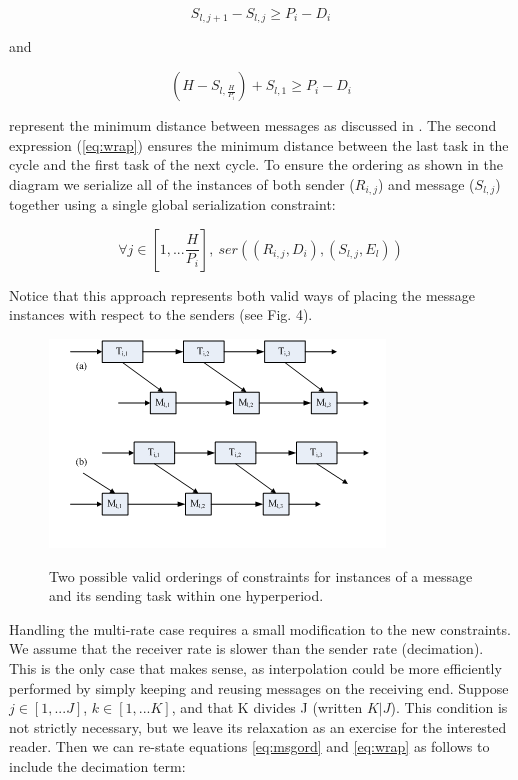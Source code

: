 \begin{equation}
\label{eq:msgord}
S_{l,j + 1}  - S_{l,j}  \geqslant P_i  - D_i 
\end{equation}

and

\begin{equation}
\label{eq:wrap}
(H - S_{l,\frac{H}
{{P_i }}} ) + S_{l,1}  \geqslant P_i  - D_i 
\end{equation}

represent the minimum distance between messages as discussed in \cite{sched:constr}.  The second expression (\ref{eq:wrap}) ensures the minimum distance between the last task in the cycle and the first task of the next cycle.
	To ensure the ordering as shown in the diagram we serialize all of the instances of both sender ($R_{i,j}$) and message ($S_{l,j}$) together using a single global serialization constraint:

\begin{equation}
\forall j \in [1,...\frac{H}{{P_i }}],\ ser((R_{i,j} ,D_i ),(S_{l,j} ,E_l ))
\end{equation}

Notice that this approach represents both valid ways of placing the message instances with respect to the senders (see Fig. 4).

\begin{figure}
		\includegraphics[scale=.6]{figures/possibilities.png}
		\centering
	  \label{fig:possibilities}
		\caption{Two possible valid orderings of constraints for instances of a message and its sending task within one hyperperiod.}
\end{figure}

Handling the multi-rate case requires a small modification to the new constraints.  We assume that the receiver rate is slower than the sender rate (decimation). This is the only case that makes sense, as interpolation could be more efficiently performed by simply keeping and reusing messages on the receiving end.  Suppose $j \in [1,...J]$, $k \in [1,...K]$, and that K divides J (written $K|J$).  This condition is not strictly necessary, but we leave its relaxation as an exercise for the interested reader.  Then we can re-state equations \ref{eq:msgord} and \ref{eq:wrap} as follows to include the decimation term:

